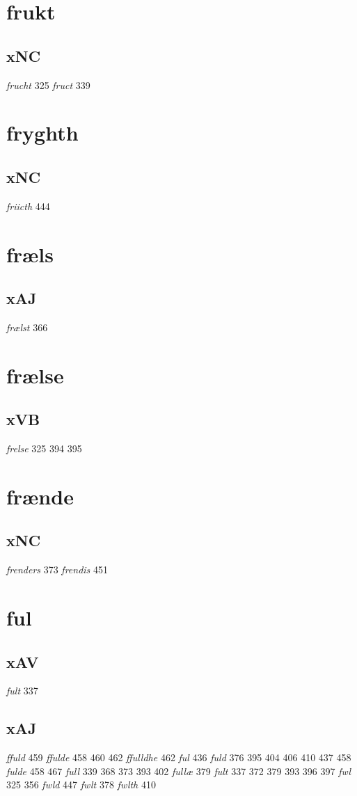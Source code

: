 \documentclass[a4paper,twocolumn]{article}
\begin{document}
\section{frukt}
\label{sec:orgf81c64c}
\subsection{xNC}
\label{sec:orgd3f5b67}
\emph{frucht} 325 \emph{fruct} 339 
\section{fryghth}
\label{sec:org749cfe4}
\subsection{xNC}
\label{sec:orgc0d10cb}
\emph{friicth} 444 
\section{fræls}
\label{sec:orgb0e298c}
\subsection{xAJ}
\label{sec:org7bb73f2}
\emph{frælst} 366 
\section{frælse}
\label{sec:orgf7f62cf}
\subsection{xVB}
\label{sec:orga362f36}
\emph{frelse} 325 394 395 
\section{frænde}
\label{sec:orgd9aab34}
\subsection{xNC}
\label{sec:org8a9632c}
\emph{frenders} 373 \emph{frendis} 451 
\section{ful}
\label{sec:org51b3615}
\subsection{xAV}
\label{sec:orge901ae0}
\emph{fult} 337 
\subsection{xAJ}
\label{sec:orgb30f180}
\emph{ffuld} 459 \emph{ffulde} 458 460 462 \emph{ffulldhe} 462 \emph{ful} 436 \emph{fuld} 376 395 404 406 410 437 458 \emph{fulde} 458 467 \emph{full} 339 368 373 393 402 \emph{fullæ} 379 \emph{fult} 337 372 379 393 396 397 \emph{fwl} 325 356 \emph{fwld} 447 \emph{fwlt} 378 \emph{fwlth} 410 
\end{document}
